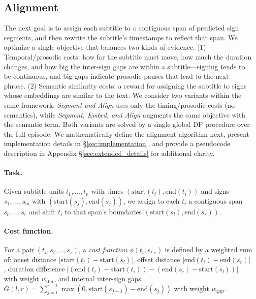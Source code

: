 \documentclass[11pt]{article}
\begin{document}
\subsection{Alignment}
\label{sec:alignment}

The next goal is to assign each subtitle to a contiguous span of predicted sign segments, and then rewrite the subtitle’s timestamps to reflect that span. 
We optimize a single objective that balances two kinds of evidence. 
(1) Temporal/prosodic costs: how far the subtitle must move, how much the duration changes, and how big the inter-sign gaps are within a subtitle—signing tends to be continuous, and big gaps indicate prosodic pauses that lead to the next phrase. 
(2) Semantic similarity costs: a reward for assigning the subtitle to signs whose embeddings are similar to the text. 
We consider two variants within the same framework: \textit{Segment and Align} uses only the timing/prosodic costs (no semantics), while \textit{Segment, Embed, and Align} augments the same objective with the semantic term. 
Both variants are solved by a single global DP procedure over the full episode.
We mathematically define the alignment algorithm next, present implementation details in \S\ref{sec:implementation}, and provide a pseudocode description in Appendix \S\ref{sec:extended_details} for additional clarity.

\paragraph{Task.} Given subtitle units $t_1,\dots,t_n$ with times $(\mathrm{start}(t_i),\mathrm{end}(t_i))$ and signs $s_1,\dots,s_m$ with $(\mathrm{start}(s_j),\mathrm{end}(s_j))$, we assign to each $t_i$ a contiguous span ${s_l,\dots,s_r}$ and shift $t_i$ to that span’s boundaries $(\mathrm{start}(s_l),\mathrm{end}(s_r))$. 

\paragraph{Cost function.}
For a pair $(t_i,{s_l,\dots,s_r})$, a \textit{cost function} $\phi(t_i,s_{l{:}r})$ is defined by a weighted sum of: onset distance $|\mathrm{start}(t_i)-\mathrm{start}(s_l)|$, offset distance $|\mathrm{end}(t_i)-\mathrm{end}(s_r)|$, duration difference $|(\mathrm{end}(t_i)-\mathrm{start}(t_i))-(\mathrm{end}(s_r)-\mathrm{start}(s_l))|$ with weight $w_{\mathrm{dur}}$, and internal inter-sign gaps $G(l,r){=}\sum_{j=l}^{r-1}\max(0,\mathrm{start}(s_{j+1})-\mathrm{end}(s_j))$ with weight $w_{\mathrm{gap}}$.
\end{document}
